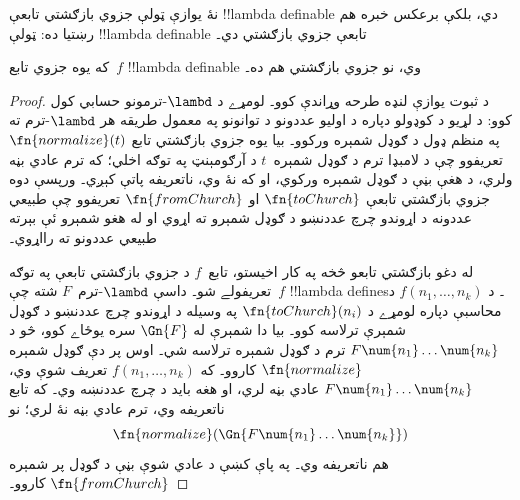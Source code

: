 \documentclass[../../../include/open-logic-section]{subfiles}
\begin{document}

نۀ يوازې ټولې جزوي بازګشتي تابعې !!{lambda definable}
دي، بلکې برعکس خبره هم رښتيا ده: ټولې
!!{lambda definable} تابعې جزوي بازګشتي دي۔

\begin{thm}
   که يوه جزوي تابع~$f$
  !!{lambda definable} وي، نو جزوي بازګشتي هم ده۔
\end{thm}

\begin{proof}
  د ثبوت يوازې لنډه طرحه وړاندې کوو۔ لومړے د
  $\lambd$-ترمونو حسابي کول کوو: د لړيو د کوډولو
  دپاره د اوليو عددونو د توانونو په معمول طريقه هر
  $\lambd$-ترم ته په منظم ډول د ګوډل شمېره ورکوو۔
  بيا يوه جزوي بازګشتي تابع $\fn{normalize}(t)$
  تعريفوو چې د لامبډا ترم د ګوډل شمېره~$t$ د
  آرګومېنټ په توګه اخلي؛ که ترم عادي بڼه ولري، د
  هغې بڼې د ګوډل شمېره ورکوي، او که نۀ وي،
  ناتعريفه پاتې کېږي۔ ورپسې دوه جزوي بازګشتي
  تابعې $\fn{toChurch}$ او $\fn{fromChurch}$
  تعريفوو چې طبيعي عددونه د اړوندو چرچ عددنښو
  د ګوډل شمېرو ته اړوي او له هغو شمېرو ئې بېرته
  طبيعي عددونو ته رااړوي۔

  له دغو بازګشتي تابعو څخه په کار اخيستو، تابع~$f$
  د جزوي بازګشتي تابعې په توګه تعريفولے شو۔ داسې
  $\lambd$-ترم~$F$ شته چې~$f$ !!{lambda define}s۔
  د $f(n_1, \dots, n_k)$ د محاسبې دپاره لومړے د
  $\fn{toChurch}(n_i)$ په وسيله د اړوندو چرچ
  عددنښو د ګوډل شمېرې ترلاسه کوو۔ بيا دا شمېرې
  له $\Gn{F}$ سره يوځاے کوو، څو د
  $F \num{n_1}\dots\num{n_k}$ ترم د ګوډل شمېره
  ترلاسه شي۔ اوس پر دې ګوډل شمېره
  $\fn{normalize}$ کاروو۔ که $f(n_1, \dots,
  n_k)$ تعريف شوې وي، $F \num{n_1}\dots\num{n_k}$
  عادي بڼه لري، او هغه بايد د چرچ عددنښه وي۔ که
  تابع ناتعريفه وي، ترم عادي بڼه
  نۀ لري؛ نو
  \[\fn{normalize}(\Gn{F\num{n_1}\dots\num{n_k}})\]
  هم ناتعريفه وي۔ په پاې کښې د عادي شوې بڼې د
  ګوډل پر شمېره $\fn{fromChurch}$ کاروو۔
\end{proof}
\end{document}
